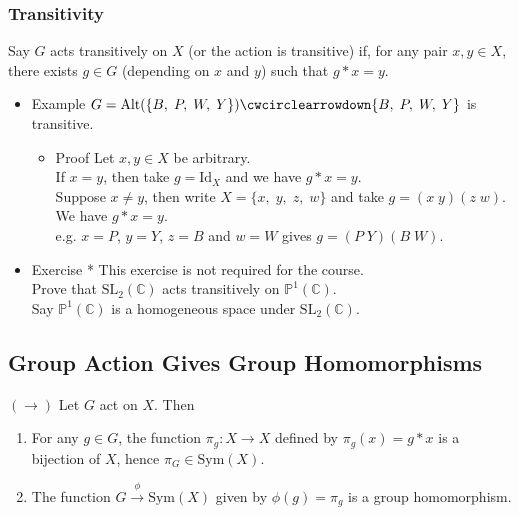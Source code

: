 \documentclass[11pt]{article}
\newcommand{\0}{\emptyset}
\newcommand{\C}{\mathbb{C}}
\begin{document}
\subsubsection*{Transitivity}
\label{sec:org8bd2069}
Say \(G\) acts transitively on \(X\) (or the action is transitive) if, for any pair \(x,y\in X\), there exists \(g\in G\) (depending on \(x\) and \(y\)) such that \(g*x=y\).\\[0pt]
\begin{itemize}
\item Example
\label{sec:org8fe28e0}
\(G=\text{Alt}(\{B,\;P,\;W,\;Y\}) \cwcirclearrowdown \{B,\;P,\;W,\;Y\}\) is transitive.\\[0pt]
\begin{itemize}
\item Proof
\label{sec:org2eecfcb}
Let \(x,y\in X\) be arbitrary.\\[0pt]
If \(x=y\), then take \(g=\text{Id}_{X}\) and we have \(g*x=y\).\\[0pt]
Suppose \(x\neq y\), then write \(X=\{x,\;y,\;z,\;w\}\) and take \(g=(x\;y)(z\;w)\). We have \(g*x=y\).\\[0pt]
e.g. \(x=P\), \(y=Y\), \(z=B\) and \(w=W\) gives \(g=(P\;Y)(B\;W)\).\\[0pt]
\end{itemize}
\item Exercise *
\label{sec:org4724dda}
This exercise is not required for the course.\\[0pt]
Prove that \(\text{SL}_{2}(\C)\) acts transitively on \(\mathbb{P}^{1}(\C)\).\\[0pt]
Say \(\mathbb{P}^{1}(\C)\) is a homogeneous space under \(\text{SL}_{2}(\C)\).\\[0pt]
\end{itemize}
\subsection*{Group Action Gives Group Homomorphisms}
\label{sec:org231f691}
\((\longrightarrow)\) Let \(G\) act on \(X\). Then\\[0pt]
\begin{enumerate}
\item For any \(g\in G\), the function \(\pi_{g}:X\to X\) defined by \(\pi_{g}(x)=g*x\) is a bijection of \(X\), hence \(\pi_{G}\in\text{Sym}(X)\).\\[0pt]
\item The function \(G\overset{\phi}{\to}\text{Sym}(X)\) given by \(\phi(g)=\pi_{g}\) is a group homomorphism.\\[0pt]
\end{enumerate}
\end{document}
